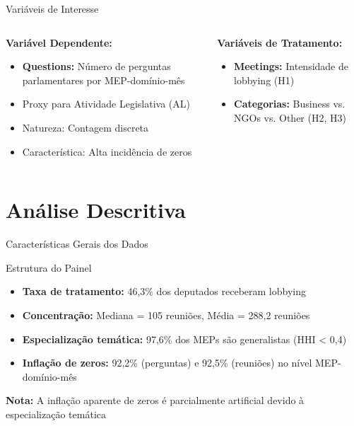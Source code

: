 \documentclass[aspectratio=169]{beamer}
\begin{document}
\begin{frame}{Variáveis de Interesse}
\begin{columns}
\begin{column}{0.5\textwidth}
\textbf{Variável Dependente:}
\begin{itemize}
\item \textbf{Questions:} Número de perguntas parlamentares por MEP-domínio-mês
\item Proxy para Atividade Legislativa (AL)
\item Natureza: Contagem discreta
\item Característica: Alta incidência de zeros
\end{itemize}
\end{column}
\begin{column}{0.5\textwidth}
\textbf{Variáveis de Tratamento:}
\begin{itemize}
\item \textbf{Meetings:} Intensidade de lobbying (H1)
\item \textbf{Categorias:} Business vs. NGOs vs. Other (H2, H3)
\end{itemize}
\end{column}
\end{columns}
\end{frame}


\section{Análise Descritiva}

\begin{frame}{Características Gerais dos Dados}
\begin{block}{Estrutura do Painel}
\begin{itemize}
\item \textbf{Taxa de tratamento:} 46,3\% dos deputados receberam lobbying
\item \textbf{Concentração:} Mediana = 105 reuniões, Média = 288,2 reuniões
\item \textbf{Especialização temática:} 97,6\% dos MEPs são generalistas (HHI < 0,4)
\item \textbf{Inflação de zeros:} 92,2\% (perguntas) e 92,5\% (reuniões) no nível MEP-domínio-mês
\end{itemize}
\end{block}

\vspace{0.3cm}

\textbf{Nota:} A inflação aparente de zeros é parcialmente artificial devido à especialização temática
\end{frame}
\end{document}
